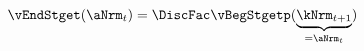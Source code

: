   \begin{equation}\begin{gathered}\begin{aligned}
\vEndStget(\aNrm_{t}) & = \DiscFac \vBegStgetp(\underbrace{\kNrm_{t+1}}_{=\aNrm_{t}}) \label{eq:vEndStget}
      \end{aligned}\end{gathered}\end{equation}
